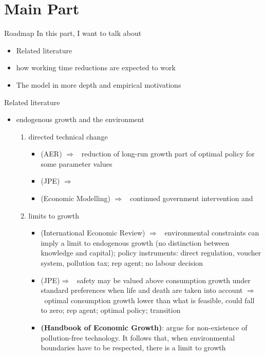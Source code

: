 \documentclass[11pt,aspectratio=169]{beamer}
\newcommand{\ar}{$\Rightarrow$ \ }
\begin{document}
\section{Main Part}
\begin{frame}{Roadmap}
In this part, I want to talk about
\begin{itemize}
\item Related literature
\item how working time reductions are expected to work
\item The model in more depth and empirical motivations
\end{itemize}
\end{frame}

\begin{frame}[allowframebreaks]{Related literature}
\begin{itemize}
\item endogenous growth and the environment
\begin{enumerate}
\item  directed technical change
\begin{itemize}
	\item \cite{Acemoglu2012TheChange}(AER) \ar reduction of long-run growth part of optimal policy for some parameter values
	\item \cite{Acemoglu2016TransitionTechnology}(JPE) \ar 
	\item \cite{Eriksson2018PhasingChange}(Economic Modelling) \ar continued government intervention and 
\end{itemize}
\item  limits to growth
\begin{itemize}
	\item \cite{Stokey1998AreGrowth}(International Economic Review) \ar environmental constraints can imply a limit to endogenous growth (no distinction between knowledge and capital); policy instruments: direct regulation, voucher system, pollution tax; rep agent; no labour decision 
	\item \cite{Jones2016LifeGrowth}(JPE)\ar safety may be valued above consumption growth under standard preferences when life and death are taken into account \ar optimal consumption growth lower than what is feasible, could fall to zero; rep agent; optimal policy; transition
	\item \textbf{\cite{Brock2005ChapterEmpirics} (Handbook of Economic Growth)}: argue for non-existence of pollution-free technology. It follows that, when environmental boundaries have to be respected, there is a limit to growth

\end{itemize}
\end{enumerate}
\end{itemize}
\end{frame}
\end{document}
